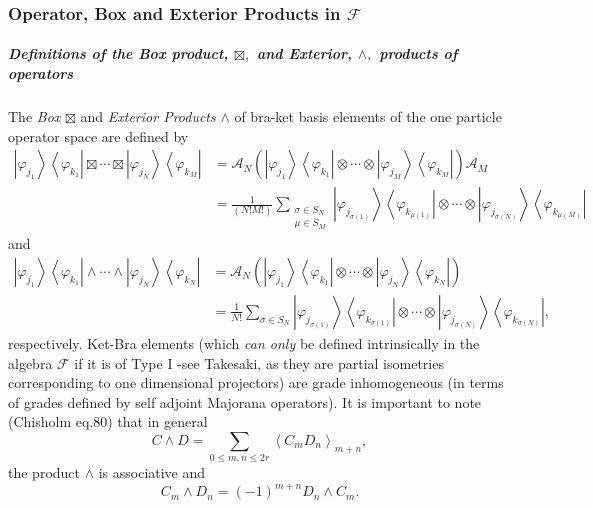 \documentclass[aps,preprint]{revtex4}%
\begin{document}
\subsubsection{Operator, Box and Exterior Products in $\mathcal{F}$}

\subparagraph{Definitions of \emph{the Box product, }$\boxtimes,$ \emph{and
Exterior, }$\wedge,$ \emph{products of operators}}

The \emph{Box }$\boxtimes$ and \emph{Exterior Products }$\wedge$ of bra-ket
basis elements of the one particle operator space are defined by
\begin{align}
\left\vert \varphi_{j_{1}}\right\rangle \left\langle \varphi_{k_{1}%
}\right\vert \boxtimes\cdots\boxtimes\left\vert \varphi_{j_{N}}\right\rangle
\left\langle \varphi_{k_{M}}\right\vert  &  =\mathcal{A}_{N}\left(  \left\vert
\varphi_{j_{1}}\right\rangle \left\langle \varphi_{k_{1}}\right\vert
\otimes\cdots\otimes\left\vert \varphi_{j_{M}}\right\rangle \left\langle
\varphi_{k_{M}}\right\vert \right)  \mathcal{A}_{M}\\
&  =\frac{1}{\left(  N!M!\right)  }\sum_{\substack{\sigma\in S_{N}\\\mu\in
S_{M}}}\left\vert \varphi_{j_{\sigma\left(  1\right)  }}\right\rangle
\left\langle \varphi_{k_{\mu\left(  1\right)  }}\right\vert \otimes
\cdots\otimes\left\vert \varphi_{j_{\sigma\left(  N\right)  }}\right\rangle
\left\langle \varphi_{k_{\mu\left(  M\right)  }}\right\vert
\end{align}
and
\begin{align}
\left\vert \varphi_{j_{1}}\right\rangle \left\langle \varphi_{k_{1}%
}\right\vert \wedge\cdots\wedge\left\vert \varphi_{j_{N}}\right\rangle
\left\langle \varphi_{k_{N}}\right\vert  &  =\mathcal{A}_{N}\left(  \left\vert
\varphi_{j_{1}}\right\rangle \left\langle \varphi_{k_{1}}\right\vert
\otimes\cdots\otimes\left\vert \varphi_{j_{N}}\right\rangle \left\langle
\varphi_{k_{N}}\right\vert \right)  \\
&  =\frac{1}{N!}\sum_{\sigma\in S_{N}}\left\vert \varphi_{j_{\sigma\left(
1\right)  }}\right\rangle \left\langle \varphi_{k_{\sigma\left(  1\right)  }%
}\right\vert \otimes\cdots\otimes\left\vert \varphi_{j_{\sigma\left(
N\right)  }}\right\rangle \left\langle \varphi_{k_{\sigma\left(  N\right)  }%
}\right\vert ,
\end{align}
respectively. Ket-Bra elements (which \emph{can only} be defined intrinsically
in the algebra $\mathcal{F}$ if it is of Type I -see Takesaki, as they are
partial isometries corresponding to one dimensional projectors) are grade
inhomogeneous (in terms of grades defined by self adjoint Majorana operators).
It is important to note (Chisholm eq.80) that in general
\begin{equation}
C\wedge D=\sum\limits_{0\leq m,n\leq2r}\left\langle C_{m}D_{n}\right\rangle
_{m+n},
\end{equation}
the product $\wedge$ is associative and
\begin{equation}
C_{m}\wedge D_{n}=\left(  -1\right)  ^{m+n}D_{n}\wedge C_{m}.
\end{equation}
\end{document}
